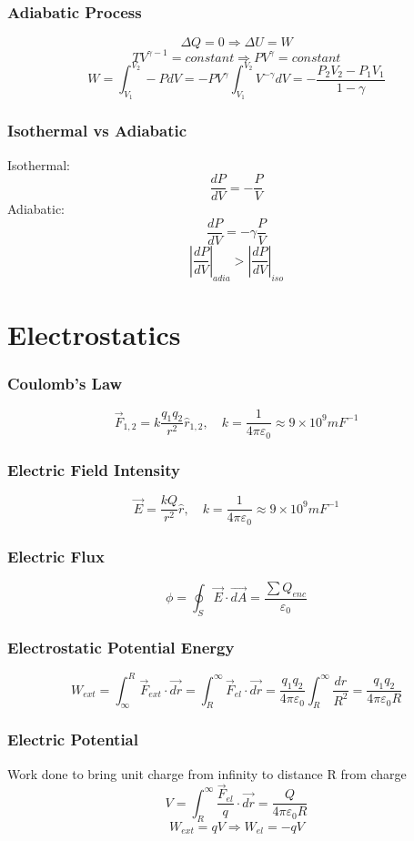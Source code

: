 \documentclass{article}
\begin{document}
\subsubsection*{Adiabatic Process}
\[\Delta Q=0 \Rightarrow \Delta U=W\]
\[TV^{\gamma -1}=constant \Rightarrow PV^\gamma=constant\]
\[W=\int_{V_1}^{V_2}-PdV=-PV^\gamma\int_{V_1}^{V_2}V^{-\gamma}dV=-\frac{P_2V_2-P_1V_1}{1-\gamma}\]

\subsubsection*{Isothermal vs Adiabatic}
Isothermal:
\[\frac{dP}{dV}=-\frac{P}{V}\]
Adiabatic:
\[\frac{dP}{dV}=-\gamma\frac{P}{V}\]
\[\left|{\frac{dP}{dV}}\right|_{adia}>\left|{\frac{dP}{dV}}\right|_{iso}\]

\section{Electrostatics}
\subsubsection*{Coulomb's Law}
\[\vec{F}_{1,2}=k\frac{q_1q_2}{r^2}\hat{r}_{1,2},\quad k=\frac{1}{4\pi\varepsilon_0}\approx9\times10^9mF^{-1}\]

\subsubsection*{Electric Field Intensity}
\[\vec{E}=\frac{kQ}{r^2}\hat{r},\quad k=\frac{1}{4\pi\varepsilon_0}\approx9\times10^9mF^{-1}\]

\subsubsection*{Electric Flux}
\[\phi=\oint_S\vec{E}\cdot\vec{dA}=\frac{\sum Q_{enc}}{\varepsilon_0}\]

\subsubsection*{Electrostatic Potential Energy}
\[W_{ext}=\int_\infty^R\vec{F}_{ext}\cdot\vec{dr}=\int_R^\infty\vec{F}_{el}\cdot\vec{dr}=\frac{q_1q_2}{4\pi\varepsilon_0}\int_R^\infty\frac{dr}{R^2}=\frac{q_1q_2}{4\pi\varepsilon_0R}\]

\subsubsection*{Electric Potential}
Work done to bring unit charge from infinity to distance R from charge
\[V=\int_R^\infty\frac{\vec{F}_{el}}{q}\cdot\vec{dr}=\frac{Q}{4\pi\varepsilon_0R}\]
\[W_{ext}=qV \Rightarrow W_{el}=-qV\]
\end{document}

